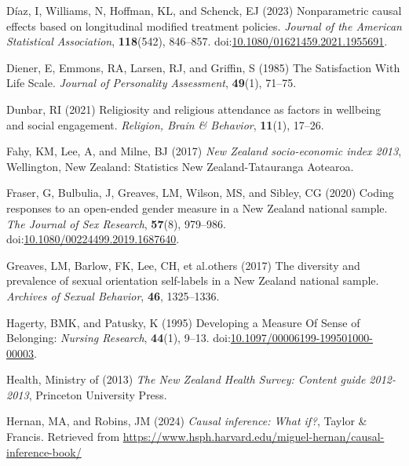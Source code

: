 \documentclass[
  single column]{article}
\newlength{\cslhangindent}
\newenvironment{CSLReferences}[2] %
 {\begin{list}{}{%
  \setlength{\itemindent}{0pt}
  \setlength{\leftmargin}{0pt}
  \setlength{\parsep}{0pt}
  \ifodd #1
   \setlength{\leftmargin}{\cslhangindent}
   \setlength{\itemindent}{-1\cslhangindent}
  \fi
  \setlength{\itemsep}{#2\baselineskip}}}
 {\end{list}}
\begin{document}
\begin{CSLReferences}{1}{0}
Díaz, I, Williams, N, Hoffman, KL, and Schenck, EJ (2023) Nonparametric
causal effects based on longitudinal modified treatment policies.
\emph{Journal of the American Statistical Association},
\textbf{118}(542), 846--857.
doi:\href{https://doi.org/10.1080/01621459.2021.1955691}{10.1080/01621459.2021.1955691}.

Diener, E, Emmons, RA, Larsen, RJ, and Griffin, S (1985) The
Satisfaction With Life Scale. \emph{Journal of Personality Assessment},
\textbf{49}(1), 71--75.

Dunbar, RI (2021) Religiosity and religious attendance as factors in
wellbeing and social engagement. \emph{Religion, Brain \& Behavior},
\textbf{11}(1), 17--26.

Fahy, KM, Lee, A, and Milne, BJ (2017) \emph{{N}ew {Z}ealand
socio-economic index 2013}, Wellington, New Zealand: Statistics New
Zealand-Tatauranga Aotearoa.

Fraser, G, Bulbulia, J, Greaves, LM, Wilson, MS, and Sibley, CG (2020)
Coding responses to an open-ended gender measure in a {N}ew {Z}ealand
national sample. \emph{The Journal of Sex Research}, \textbf{57}(8),
979--986.
doi:\href{https://doi.org/10.1080/00224499.2019.1687640}{10.1080/00224499.2019.1687640}.

Greaves, LM, Barlow, FK, Lee, CH, et al.others (2017) The diversity and
prevalence of sexual orientation self-labels in a {N}ew {Z}ealand
national sample. \emph{Archives of Sexual Behavior}, \textbf{46},
1325--1336.

Hagerty, BMK, and Patusky, K (1995) Developing a Measure Of Sense of
Belonging: \emph{Nursing Research}, \textbf{44}(1), 9--13.
doi:\href{https://doi.org/10.1097/00006199-199501000-00003}{10.1097/00006199-199501000-00003}.

Health, Ministry of (2013) \emph{The {N}ew {Z}ealand {H}ealth {S}urvey:
Content guide 2012-2013}, Princeton University Press.

Hernan, MA, and Robins, JM (2024) \emph{Causal inference: What if?},
Taylor \& Francis. Retrieved from
\url{https://www.hsph.harvard.edu/miguel-hernan/causal-inference-book/}


\end{CSLReferences}
\end{document}

